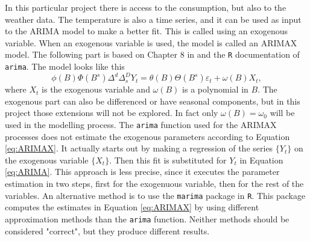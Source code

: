 \noindent In this particular project there is access to the consumption, but also to the weather data. The temperature is also a time series, and it can be used as input to the ARIMA model to make a better fit. This is called using an exogenous variable. When an exogenous variable is used, the model is called an ARIMAX model. The following part is based on Chapter $8$ in \cite{Time_Series_Analysis} and the \texttt{R} documentation of \texttt{arima}. The model looks like this
\begin{equation}
    \phi (B) \Phi (B^s) \Delta^d \Delta_s^D Y_t = \theta (B) \Theta (B^s) \varepsilon_t + \omega(B) X_t,
    \label{eq:ARIMAX}
\end{equation}
where $X_t$ is the exogenous variable and $\omega(B)$ is a polynomial in $B$. The exogenous part can also be differenced or have seasonal components, but in this project those extensions will not be explored. In fact only $\omega(B)=\omega_0$ will be used in the modelling process. The \texttt{arima} function used for the ARIMAX processes does not estimate the exogenous parameters according to Equation \cref{eq:ARIMAX}. It actually starts out by making a regression of the series $\{Y_t\}$ on the exogenous variable $\{X_t\}$. Then this fit is substituted for $Y_t$ in Equation \cref{eq:ARIMA}. This approach is less precise, since it executes the parameter estimation in two steps, first for the exogenuous variable, then for the rest of the variables. An alternative method is to use the \texttt{marima} package in \texttt{R}. This package computes the estimates in Equation \cref{eq:ARIMAX} by using different approximation methods than the \texttt{arima} function. Neither methods should be considered "correct", but they produce different results.

